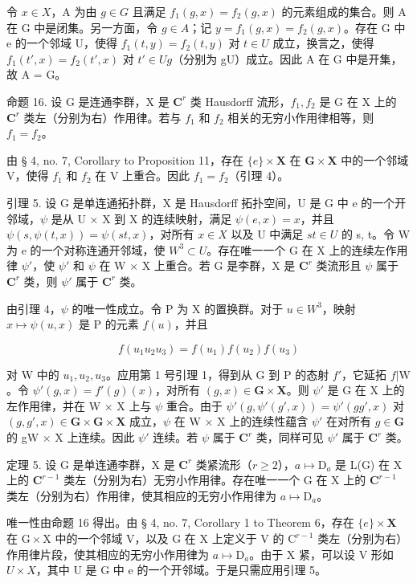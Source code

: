 令 \(x \in X\)，A 为由 \(g \in G\) 且满足 \(f_{1}(g, x) = f_{2}(g, x)\) 的元素组成的集合。则 A 在 G 中是闭集。另一方面，令 \(g \in A\)；记 \(y = f_{1}(g, x) = f_{2}(g, x)\)。存在 G 中 e 的一个邻域 U，使得 \(f_{1}(t, y) = f_{2}(t, y)\) 对 \(t \in U\) 成立，换言之，使得 \(f_{1}(t', x) = f_{2}(t', x)\) 对 \(t' \in Ug\)（分别为 gU）成立。因此 A 在 G 中是开集，故 A = G。

命题 16. 设 G 是连通李群，X 是 \(\mathbf{C}^r\) 类 Hausdorff 流形，\(f_1, f_2\) 是 G 在 X 上的 \(\mathbf{C}^r\) 类左（分别为右）作用律。若与 \(f_1\) 和 \(f_2\) 相关的无穷小作用律相等，则 \(f_1 = f_2\)。

由 § 4, no. 7, Corollary to Proposition 11，存在 \(\{e\} \times \mathbf{X}\) 在 \(\mathbf{G} \times \mathbf{X}\) 中的一个邻域 V，使得 \(f_{1}\) 和 \(f_{2}\) 在 V 上重合。因此 \(f_{1} = f_{2}\)（引理 4）。

引理 5. 设 G 是单连通拓扑群，X 是 Hausdorff 拓扑空间，U 是 G 中 e 的一个开邻域，\(\psi\) 是从 U × X 到 X 的连续映射，满足 \(\psi(e, x) = x\)，并且 \(\psi(s, \psi(t, x)) = \psi(st, x)\)，对所有 \(x \in X\) 以及 U 中满足 \(st \in U\) 的 s, t。令 W 为 e 的一个对称连通开邻域，使 \(W^{3} \subset U\)。存在唯一一个 G 在 X 上的连续左作用律 \(\psi'\)，使 \(\psi'\) 和 \(\psi\) 在 W × X 上重合。若 G 是李群，X 是 \(\mathbf{C}^r\) 类流形且 \(\psi\) 属于 \(\mathbf{C}^r\) 类，则 \(\psi'\) 属于 \(\mathbf{C}^r\) 类。

由引理 4，\(\psi\) 的唯一性成立。令 P 为 X 的置换群。对于 \(u \in W^{3}\)，映射 \(x \mapsto \psi(u, x)\) 是 P 的元素 \(f(u)\)，并且

\[
f \left(u _ {1} u _ {2} u _ {3}\right) = f \left(u _ {1}\right) f \left(u _ {2}\right) f \left(u _ {3}\right)
\]

对 W 中的 \(u_{1}, u_{2}, u_{3}\)。应用第 1 号引理 1，得到从 G 到 P 的态射 \(f'\)，它延拓 \(f|\mathrm{W}\)。令 \(\psi'(g,x)=f'(g)(x)\)，对所有 \((g,x)\in\mathbf{G}\times\mathbf{X}\)。则 \(\psi'\) 是 G 在 X 上的左作用律，并在 W × X 上与 \(\psi\) 重合。由于 \(\psi'(g,\psi'(g',x))=\psi'(gg',x)\) 对 \((g,g',x)\in\mathbf{G}\times\mathbf{G}\times\mathbf{X}\) 成立，\(\psi\) 在 W × X 上的连续性蕴含 \(\psi'\) 在对所有 \(g\in\mathbf{G}\) 的 gW × X 上连续。因此 \(\psi'\) 连续。若 \(\psi\) 属于 \(\mathbf{C}^r\) 类，同样可见 \(\psi'\) 属于 \(\mathbf{C}^r\) 类。

定理 5. 设 G 是单连通李群，X 是 \(\mathbf{C}^r\) 类紧流形（\(r \geqslant 2\)），\(a \mapsto \mathrm{D}_a\) 是 L(G) 在 X 上的 \(\mathbf{C}^{r-1}\) 类左（分别为右）无穷小作用律。存在唯一一个 G 在 X 上的 \(\mathbf{C}^{r-1}\) 类左（分别为右）作用律，使其相应的无穷小作用律为 \(a \mapsto \mathrm{D}_a\)。

唯一性由命题 16 得出。由 § 4, no. 7, Corollary 1 to Theorem 6，存在 \(\{e\} \times \mathbf{X}\) 在 \(\mathrm{G} \times \mathrm{X}\) 中的一个邻域 V，以及 G 在 X 上定义于 V 的 \(\mathrm{C}^{r-1}\) 类左（分别为右）作用律片段，使其相应的无穷小作用律为 \(a \mapsto \mathrm{D}_a\)。由于 X 紧，可以设 V 形如 \(U \times X\)，其中 U 是 G 中 e 的一个开邻域。于是只需应用引理 5。
